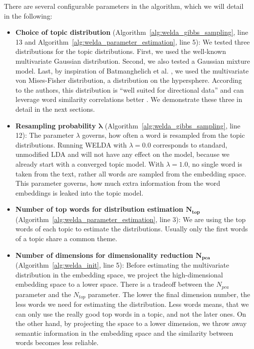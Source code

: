 \documentclass[
        a4paper,
        titlepage,
        twoside,
        parskip,
        numbers=noenddot
        ]{scrbook}
\theoremstyle{break}
\begin{document}
There are several configurable parameters in the algorithm, which we will detail in the following:
\begin{itemize}
  \item \textbf{Choice of topic distribution} (Algorithm~\ref{alg:welda_gibbs_sampling}, line 13 and Algorithm~\ref{alg:welda_parameter_estimation}, line 5):
    We tested three distributions for the topic distributions.
    First, we used the well-known multivariate Gaussian distribution.
    Second, we also tested a Gaussian mixture model.
    Last, by inspiration of Batmanghelich et al. \cite{Batmanghelich2016}, we used the multivariate von Mises-Fisher distribution, a distribution on the hypersphere.
    According to the authors, this distribution is ``well suited for directional data'' and can leverage word similarity correlations better \cite{Batmanghelich2016}.
    We demonstrate these three in detail in the next sections.
  \item \textbf{Resampling probability $\boldsymbol{\lambda}$} (Algorithm~\ref{alg:welda_gibbs_sampling}, line 12):
    The parameter $\lambda$ governs, how often a word is resampled from the topic distributions.
    Running WELDA with $\lambda = 0.0$ corresponds to standard, unmodified LDA and will not have any effect on the model, because we already start with a converged topic model.
    With $\lambda = 1.0$, no single word is taken from the text, rather all words are sampled from the embedding space.
    This parameter governs, how much extra information from the word embeddings is leaked into the topic model.
  \item \textbf{Number of top words for distribution estimation $\boldsymbol{N_{top}}$} (Algorithm~\ref{alg:welda_parameter_estimation}, line 3):
    We are using the top words of each topic to estimate the distributions.
    Usually only the first words of a topic share a common theme.
  \item \textbf{Number of dimensions for dimensionality reduction $\boldsymbol{N_{pca}}$} (Algorithm~\ref{alg:welda_init}, line 5):
    Before estimating the multivariate distribution in the embedding space, we project the high-dimensional embedding space to a lower space.
    There is a tradeoff between the $N_{pca}$ parameter and the $N_{top}$ parameter.
    The lower the final dimension number, the less words we need for estimating the distribution.
    Less words means, that we can only use the really good top words in a topic, and not the later ones.
    On the other hand, by projecting the space to a lower dimension, we throw away semantic information in the embedding space and the similarity between words becomes less reliable.

\end{itemize}
\end{document}
